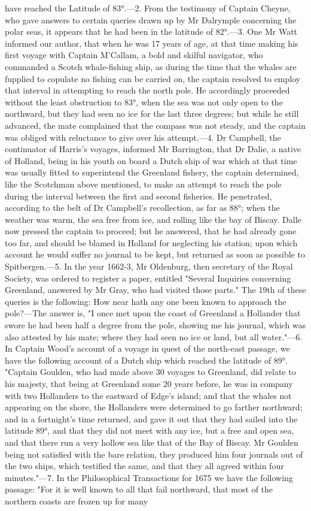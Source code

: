\documentclass{article}
\begin{document}
have reached the Latitude of 83°.—2. From the testimony of Captain Cheyne, who gave answers to certain queries drawn up by Mr Dalrymple concerning the polar seas, it appears that he had been in the latitude of 82°.—3. One Mr Watt informed our author, that when he was 17 years of age, at that time making his first voyage with Captain M'Callam, a bold and skilful navigator, who commanded a Scotch whale-fishing ship, as during the time that the whales are fupplied to copulate no fishing can be carried on, the captain resolved to employ that interval in attempting to reach the north pole. He accordingly proceeded without the least obstruction to 83°, when the sea was not only open to the northward, but they had seen no ice for the last three degrees; but while he still advanced, the mate complained that the compass was not steady, and the captain was obliged with reluctance to give over his attempt.—4. Dr Campbell, the continuator of Harris's voyages, informed Mr Barrington, that Dr Dalie, a native of Holland, being in his youth on board a Dutch ship of war which at that time was usually fitted to superintend the Greenland fishery, the captain determined, like the Scotchman above mentioned, to make an attempt to reach the pole during the interval between the first and second fisheries. He penetrated, according to the belt of Dr Campbell's recollection, as far as 88°; when the weather was warm, the sea free from ice, and rolling like the bay of Biscay. Dalle now pressed the captain to proceed; but he answered, that he had already gone too far, and should be blamed in Holland for neglecting his station; upon which account he would suffer no journal to be kept, but returned as soon as possible to Spitbergen.—5. In the year 1662-3, Mr Oldenburg, then secretary of the Royal Society, was ordered to register a paper, entitled "Several Inquiries concerning Greenland, answered by Mr Gray, who had visited those parts." The 19th of these queries is the following: How near hath any one been known to approach the pole?—The answer is, "I once met upon the coast of Greenland a Hollander that swore he had been half a degree from the pole, showing me his journal, which was also attested by his mate; where they had seen no ice or land, but all water."—6. In Captain Wood's account of a voyage in quest of the north-east passage, we have the following account of a Dutch ship which reached the latitude of 89°. "Captain Goulden, who had made above 30 voyages to Greenland, did relate to his majesty, that being at Greenland some 20 years before, he was in company with two Hollanders to the eastward of Edge's island; and that the whales not appearing on the shore, the Hollanders were determined to go farther northward; and in a fortnight's time returned, and gave it out that they had sailed into the latitude 89°, and that they did not meet with any ice, but a free and open sea, and that there run a very hollow sea like that of the Bay of Biscay. Mr Goulden being not satisfied with the bare relation, they produced him four journals out of the two ships, which testified the same, and that they all agreed within four minutes."—7. In the Philosophical Transactions for 1675 we have the following passage: "For it is well known to all that fail northward, that most of the northern coasts are frozen up for many 
\end{document}
